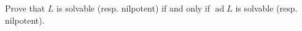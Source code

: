 Prove that $L$ is solvable (resp. nilpotent) if and only if $\operatorname{ad} L$ is solvable (resp. nilpotent).

